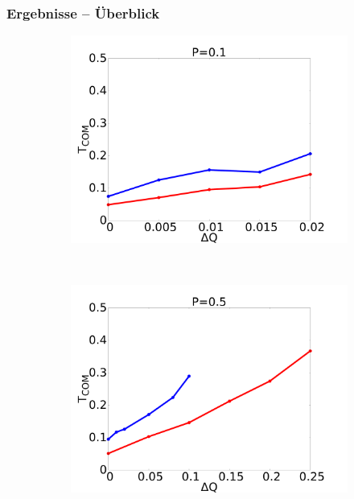 \documentclass[handout]{beamer}
\begin{document}
\begin{frame}
\frametitle{Ergebnisse -- Überblick}
\begin{figure}[h]
    \begin{center}
        \begin{subfigure}[t]{0.3\textwidth}
            \includegraphics[scale=0.09]{../images/p01_com.pdf}
        \end{subfigure} 
        \
        \begin{subfigure}[t]{0.3\textwidth}
            \includegraphics[scale=0.09]{../images/p05_com.pdf}
        \end{subfigure} 
        \
        \begin{subfigure}[t]{0.3\textwidth}

\end{subfigure}
\end{center}
\end{figure}
\end{frame}
\end{document}
